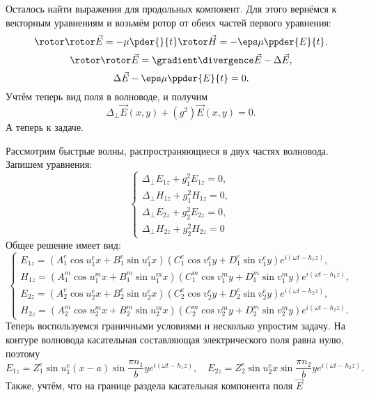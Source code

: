 \documentclass[a4paper]{article}
\renewcommand{\frac}{\dfrac}
\begin{document}
    Осталось найти выражения для продольных компонент. Для этого вернёмся к
    векторным уравнениям и возьмём ротор от обеих частей первого уравнения:
    \[
        \rotor\rotor\vec{E} = -\mu \pder{}{t}\rotor\vec{H} =
        -\eps\mu\ppder{E}{t}.
    \]
    \[
        \rotor\rotor\vec{E} = \gradient\divergence\vec{E} - \Delta\vec{E},
    \]
    \[
        \Delta\vec{E} - \eps\mu\ppder{E}{t} = 0.
    \]
    Учтём теперь вид поля в волноводе, и получим
    \[
        \Delta_\perp \vec{E}(x,y) + (g^2)\vec{E}(x,y) = 0.
    \]
    А теперь к задаче.

    Рассмотрим быстрые волны, распространяющиеся в двух частях волновода.
    Запишем уравнения:
    \[
        \left\{
        \begin{array}{l}
            \Delta_\perp E_{1z} + g_1^2 E_{1z} = 0,\\
            \Delta_\perp H_{1z} + g_1^2 H_{1z} = 0,\\
            \Delta_\perp E_{2z} + g_2^2 E_{2z} = 0,\\
            \Delta_\perp H_{2z} + g_2^2 H_{2z} = 0
        \end{array}
        \right.
    \]
    Общее решение имеет вид:
    \[
        \left\{
        \begin{array}{l}
            E_{1z} =
            (A^e_1\cos u^e_1 x + B^e_1\sin u^e_1 x)
            (C^e_1\cos v^e_1 y + D^e_1\sin v^e_1 y)
            e^{i(\omega t - h_1 z)}, \\
            H_{1z} =
            (A^m_1\cos u^m_1 x + B^m_1\sin u^m_1 x)
            (C^m_1\cos v^m_1 y + D^m_1\sin v^m_1 y)
            e^{i(\omega t - h_1 z)}, \\
            E_{2z} =
            (A^e_2\cos u^e_2 x + B^e_2\sin u^e_2 x)
            (C^e_2\cos v^e_2 y + D^e_2\sin v^e_2 y)
            e^{i(\omega t - h_2 z)}, \\
            H_{2z} =
            (A^m_2\cos u^m_2 x + B^m_2\sin u^m_2 x)
            (C^m_2\cos v^m_2 y + D^m_2\sin v^m_2 y)
            e^{i(\omega t - h_2 z)}.
        \end{array}
        \right.
    \]
Теперь воспользуемся граничными условиями и несколько упростим задачу.
На контуре волновода касательная составляющая электрического поля равна нулю,
поэтому
    \[
        E_{1z} = Z^e_1\sin u^e_1 (x-a) \sin \frac{\pi n_1}{b}y
        e^{i(\omega t - h_1 z)},\quad
        E_{2z} = Z^e_2\sin u^e_2 x \sin \frac{\pi n_2}{b}y
        e^{i(\omega t - h_2 z)}.
    \]
Также, учтём, что на границе раздела касательная компонента поля \( \vec{E} \)
\end{document}
